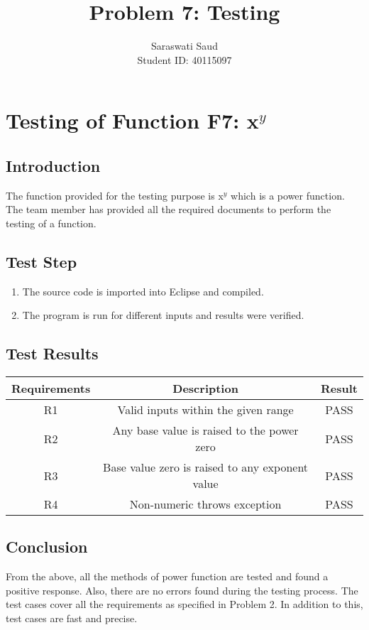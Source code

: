 \documentclass[a4paper,12pt]{article}
\title{Problem 7: Testing}
\author{Saraswati Saud \\
Student ID: 40115097}
\date{}
\begin{document}
\maketitle
\section{Testing of Function F7: x$^y$}
    \subsection{Introduction}
    The function provided for the testing purpose is x$^y$ which is a power function. The team member has provided all the required documents to perform the testing of a function.
    \subsection{Test Step}
    \begin{enumerate}
        \item The source code is imported into Eclipse and compiled.
        \item The program is run for different inputs and results were verified.
    \end{enumerate}
    
    \subsection{Test Results}
    \begin{center}
    \begin{tabular}{||c c c||} 
     \hline
     Requirements & Description & Result \\ 
     \hline\hline
     R1 & Valid inputs within the given range & PASS \\ 
     \hline
     R2 & Any base value is raised to the power zero & PASS \\
     \hline
     R3 & Base value zero is raised to any exponent value & PASS \\
     \hline
     R4 & Non-numeric throws exception & PASS \\
     \hline
    \end{tabular}
    \end{center}
    
    \subsection{Conclusion}
    From the above, all the methods of power function are tested and found a positive response. Also, there are no errors found during the testing process. The test cases cover all the requirements as specified in Problem 2. In addition to this, test cases are fast and precise.
\end{document}
